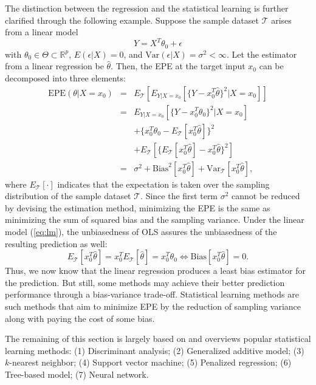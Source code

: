 \documentclass[12pt]{article}
\newcommand{\Var}{\mathrm{Var}}
\begin{document}
The distinction between the regression and the statistical learning is further clarified through the following example. Suppose the sample dataset $\mathcal{T}$ arises from a linear model
\begin{equation}
\label{eq:lm}
Y = X^T \theta_0 + \epsilon
\end{equation}
with $\theta_0 \in \Theta \subset \mathbb{R}^p$, $E(\epsilon | X) = 0$, and $\Var(\epsilon | X) = \sigma^2 < \infty$. Let the estimator from a linear regression be $\hat{\theta}$. Then, the EPE at the target input $x_0$ can be decomposed into three elements:
\begin{eqnarray*}
{\mathrm {EPE}}(\theta | X = x_0) &=& E_{\mathcal{T}}\left[E_{Y|X=x_0}[\{Y - x_0^T \hat{\theta}\}^2 | X = x_0]\right]\\
&=&  E_{Y|X=x_0}[\{Y - x_0^T \theta_0\}^2 | X = x_0]\\
&\phantom{=}& + \{x_0^T \theta_0 - E_{\mathcal{T}}[x_0^T \hat{\theta}]\}^2\\
&\phantom{=}& + E_{\mathcal{T}}[\{E_{\mathcal{T}}[x_0^T \hat{\theta}] - x_0^T \hat{\theta}\}^2]\\
&=& \sigma^2 + {\mathrm {Bias}}^2[x_0^T \hat{\theta}] + {\mathrm {Var}}_{\mathcal{T}}[x_0^T \hat{\theta}],
\end{eqnarray*}
where $E_{\mathcal{T}}[\cdot]$ indicates that the expectation is taken over the sampling distribution of the sample dataset $\mathcal{T}$. Since the first term $\sigma^2$ cannot be reduced by devising the estimation method, minimizing the EPE is the same as minimizing the sum of squared bias and the sampling variance. Under the linear model (\ref{eq:lm}), the unbiasedness of OLS assures the unbiasedness of the resulting prediction as well:
\begin{equation*}
E_{\mathcal{T}}[x_0^T \hat{\theta}] = x_0^T E_{\mathcal{T}}[\hat{\theta}] = x_0^T \theta_0 \Leftrightarrow {\mathrm {Bias}}[x_0^T \hat{\theta}] = 0.
\end{equation*}
Thus, we now know that the linear regression produces a least bias estimator for the prediction. But still, some methods may achieve their better prediction performance through a bias-variance trade-off. Statistical learning methods are such methods that aim to minimize EPE by the reduction of sampling variance along with paying the cost of some bias.

The remaining of this section is largely based on \textcite{Hastie2009} and overviews popular statistical learning methods: (1) Discriminant analysis; (2) Generalized additive model; (3) $k$-nearest neighbor; (4) Support vector machine; (5) Penalized regression; (6) Tree-based model; (7) Neural network.
\end{document}
